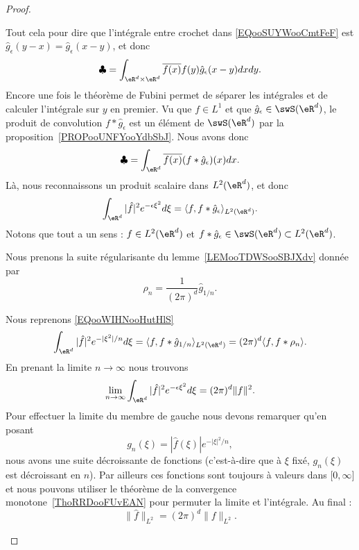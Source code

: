 \begin{proof}
\begin{subproof}
		Tout cela pour dire que l'intégrale entre crochet dans \eqref{EQooSUYWooCmtFeF} est \( \hat g_{\epsilon}(y-x)=\hat g_{\epsilon}(x-y)\), et donc
		\begin{equation}
			\clubsuit=\int_{\eR^d\times \eR^d} \overline{ f(x) }f(y)  \hat g_{\epsilon}(x-y)  dxdy.
		\end{equation}
		Encore une fois le théorème de Fubini permet de séparer les intégrales et de calculer l'intégrale sur \( y\) en premier. Vu que \( f\in L^1\) et que \( \hat g_{\epsilon}\in \swS(\eR^d)\), le produit de convolution \( f*\hat g_{\epsilon}\) est un élément de \( \swS(\eR^d)\) par la proposition~\ref{PROPooUNFYooYdbSbJ}.
		Nous avons donc
		\begin{equation}
			\clubsuit=\int_{\eR^d}\overline{ f(x) }(f* \hat g_{\epsilon})(x)dx.
		\end{equation}
		Là, nous reconnaissons un produit scalaire dans \( L^2(\eR^d)\), et donc
		\begin{equation}        \label{EQooWIHNooHutHlS}
			\int_{\eR^d}| \hat f |^2 e^{-\epsilon\xi^2}d\xi=\langle f, f*\hat g_{\epsilon}\rangle_{L^2(\eR^d)}.
		\end{equation}
		Notons que tout a un sens : \( f\in L^2(\eR^d)\) et \( f*\hat g_{\epsilon}\in\swS(\eR^d)\subset L^2(\eR^d)\).


		Nous prenons la suite régularisante du lemme~\ref{LEMooTDWSooSBJXdv} donnée par
		\begin{equation}
			\rho_n=\frac{1}{ (2\pi)^d }\hat g_{1/n}.
		\end{equation}

		Nous reprenons \eqref{EQooWIHNooHutHlS}
		\begin{equation}
			\int_{\eR^d}| \hat f |^2 e^{-| \xi^2 |/n}d\xi=\langle f, f*\hat g_{1/n}\rangle_{L^2(\eR^d)}=(2\pi)^d\langle f, f* \rho_n \rangle .
		\end{equation}
		En prenant la limite \( n\to \infty\) nous trouvons
		\begin{equation}
			\lim_{n\to \infty}\int_{\eR^d}| \hat f |^2 e^{-\epsilon\xi^2}d\xi=(2\pi)^d\| f \|^2.
		\end{equation}
		Pour effectuer la limite du membre de gauche nous devons remarquer qu'en posant
		\begin{equation}
			g_n(\xi)=| \hat f(\xi) | e^{-| \xi |^2/n},
		\end{equation}
		nous avons une suite décroissante de fonctions (c'est-à-dire que à \( \xi\) fixé, \( g_n(\xi)\) est décroissant en \(n\)). Par ailleurs ces fonctions sont toujours à valeurs dans \( \mathopen[ 0 , \infty \mathclose]\) et nous pouvons utiliser le théorème de la convergence monotone~\ref{ThoRRDooFUvEAN} pour permuter la limite et l'intégrale. Au final :
		\begin{equation}
			\| \hat f \|_{L^2}=(2\pi)^d\| f \|_{L^2}.
		\end{equation}
	\end{subproof}


\end{proof}
